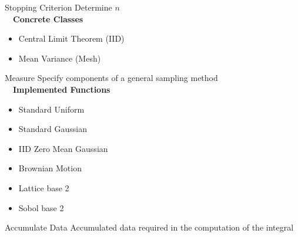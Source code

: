 \documentclass[final]{beamer}
\newlength{\onecolwid}
\newlength{\threecolwid}
\begin{document}
\begin{frame}[t]
\begin{columns}[t]
\begin{column}{\threecolwid}
\begin{columns}[t,totalwidth=\threecolwid]
\begin{column}{\onecolwid}%
\begin{alertblock}{Stopping Criterion}
    Determine $n$ \\[1ex]~\
    \textbf{Concrete Classes}
    \begin{itemize}
        \item Central Limit Theorem (IID)
        \item Mean Variance (Mesh)
    \end{itemize}
\end{alertblock}%

\begin{alertblock}{Measure}
    Specify components of a general sampling method \\[1ex]~\
    \textbf{Implemented Functions}
    \begin{itemize}
        \item Standard Uniform
        \item Standard Gaussian
        \item IID Zero Mean Gaussian
        \item Brownian Motion 
        \item Lattice base 2
        \item Sobol base 2
    \end{itemize}
\end{alertblock}%

\begin{alertblock}{Accumulate Data}
    Accumulated data required in the computation of the integral
\end{alertblock}
\end{column}
\end{columns}


\end{column}
\end{columns}
\end{frame}
\end{document}
